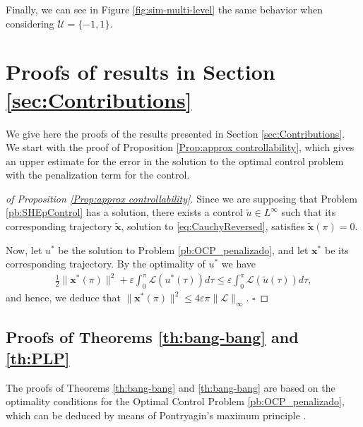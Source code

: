 \documentclass[twocolumn]{autart}    %
\begin{document}
Finally, we can see in Figure \ref{fig:sim-multi-level} the same behavior when considering  $\mathcal{U} = \{-1,1\}$.
 

\section{Proofs of results in Section \ref{sec:Contributions}}\label{sec:Proof}

We give here the proofs of the results presented in Section \ref{sec:Contributions}. We start with the proof of Proposition \ref{Prop:approx controllability}, which gives an upper estimate for the error in the solution to the optimal control problem with the penalization term for the control. 

\bigskip

\begin{proof}[of Proposition \ref{Prop:approx controllability}]
Since we are supposing that Problem \ref{pb:SHEpControl} has a solution, there exists a control $\tilde{u}\in L^\infty$ such that its corresponding trajectory $\tilde{\bm{x}}$, solution to \eqref{eq:CauchyReversed}, satisfies $\tilde{\bm{x}}(\pi) = 0$. 

Now, let $u^\ast$ be the solution to Problem \ref{pb:OCP_penalizado}, and let $\bm{x}^\ast$ be its corresponding trajectory. By the optimality of $u^\ast$ we have
\begin{align*}
	\frac{1}{2} \| \bm{x}^\ast(\pi)\|^2 +\varepsilon \int_0^\pi \mathcal{L}(u^\ast(\tau))d\tau \leq \varepsilon \int_0^\pi \mathcal{L}(\tilde{u}(\tau))d\tau,
\end{align*}
and hence, we deduce that $\| \bm{x}^\ast (\pi)\|^2 \leq 4 \varepsilon \pi \| \mathcal{L}\|_\infty.$ \hfill $\square$
\end{proof}

\subsection{Proofs of Theorems \ref{th:bang-bang} and \ref{th:PLP}}

The proofs of Theorems \ref{th:bang-bang} and \ref{th:bang-bang} are based on the optimality conditions for the Optimal Control Problem \ref{pb:OCP_penalizado}, which can be deduced by means of Pontryagin's maximum principle \cite[Chapter~2.7]{bryson1975applied}.
\end{document}
